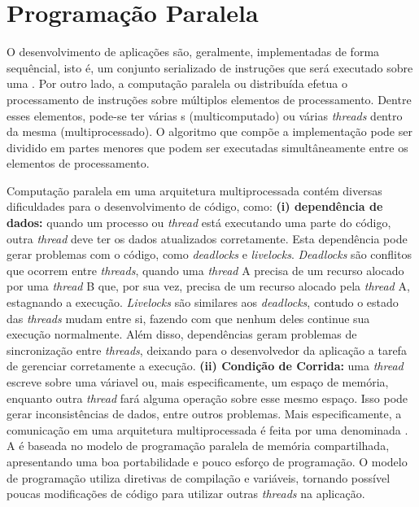 \section{Programação Paralela}
O desenvolvimento de aplicações são, geralmente, implementadas de forma sequêncial, isto é, um conjunto serializado de instruções que será executado sobre uma \cpu. Por outro lado, a computação paralela ou distribuída efetua o processamento de instruções sobre múltiplos elementos de processamento. Dentre esses elementos, pode-se ter várias \cpu{}s (multicomputado) ou várias \textit{threads} dentro da mesma \cpu (multiprocessado). O algoritmo que compõe a implementação pode ser dividido em partes menores que podem ser executadas simultâneamente entre os elementos de processamento.


Computação paralela em uma arquitetura multiprocessada contém diversas dificuldades para o desenvolvimento de código, como: \textbf{(i) dependência de dados:} quando um processo ou \textit{thread} está executando uma parte do código, outra \textit{thread} deve ter os dados atualizados corretamente. Esta dependência pode gerar problemas com o código, como \textit{deadlocks} e \textit{livelocks}. \textit{Deadlocks} são conflitos que ocorrem entre \textit{threads}, quando uma \textit{thread} A precisa de um recurso alocado por uma \textit{thread} B que, por sua vez, precisa de um recurso alocado pela \textit{thread} A, estagnando a execução. \textit{Livelocks} são similares aos \textit{deadlocks}, contudo o estado das \textit{threads} mudam entre si, fazendo com que nenhum deles continue sua execução normalmente. Além disso, dependências geram problemas de sincronização entre \textit{threads}, deixando para o desenvolvedor da aplicação a tarefa de gerenciar corretamente a execução.%
\textbf{(ii) Condição de Corrida:} uma \textit{thread} escreve sobre uma váriavel ou, mais especificamente, um espaço de memória, enquanto outra \textit{thread} fará alguma operação sobre esse mesmo espaço. Isso pode gerar inconsistências de dados, entre outros problemas.
Mais especificamente, a comunicação em uma arquitetura multiprocessada é feita por uma \api denominada \openMP. A \api é baseada no modelo de programação paralela de memória compartilhada, apresentando uma boa portabilidade e pouco esforço de programação. O modelo de programação utiliza diretivas de compilação e variáveis, tornando possível poucas modificações de código para utilizar outras \textit{threads} na aplicação.

